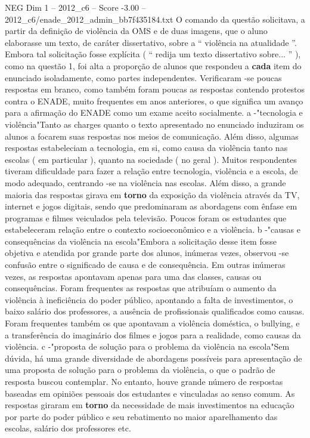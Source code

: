 \begin{textsample}{NEG Dim 1 – 2012\_c6 – Score -3.00 – 2012\_c6/enade\_2012\_admin\_bb7f435184.txt}
O comando da questão solicitava, a partir da definição de violência da OMS e de duas imagens, que o aluno elaborasse um texto, de caráter dissertativo, sobre a “ violência na atualidade ”.
Embora tal solicitação fosse explícita ( “ redija um texto dissertativo sobre... ” ), como na questão 1, foi alta a proporção de alunos que respondeu a \textbf{cada} item do enunciado isoladamente, como partes independentes.
Verificaram -se poucas respostas em branco, como também foram poucas as respostas contendo protestos contra o ENADE, muito frequentes em anos anteriores, o que significa um avanço para a afirmação do ENADE como um exame aceito socialmente. a -"tecnologia e violência"Tanto as charges quanto o texto apresentado no enunciado induziram os alunos a focarem suas respostas nos meios de comunicação.
Além disso, algumas respostas estabeleciam a tecnologia, em si, como causa da violência tanto nas escolas ( em particular ), quanto na sociedade ( no geral ).
Muitos respondentes tiveram dificuldade para fazer a relação entre tecnologia, violência e a escola, de modo adequado, centrando -se na violência nas escolas.
Além disso, a grande maioria das respostas girava em \textbf{torno} da exposição da violência através da TV, internet e jogos digitais, sendo que predominaram as abordagens com ênfase em programas e filmes veiculados pela televisão.
Poucos foram os estudantes que estabeleceram relação entre o contexto socioeconômico e a violência. b -"causas e consequências da violência na escola"Embora a solicitação desse item fosse objetiva e atendida por grande parte dos alunos, inúmeras vezes, observou -se confusão entre o significado de causa e de consequência.
Em outras inúmeras vezes, as respostas apontavam apenas para uma das classes, causas ou consequências.
Foram frequentes as respostas que atribuíam o aumento da violência à ineficiência do poder público, apontando a falta de investimentos, o baixo salário dos professores, a ausência de profissionais qualificados como causas.
Foram frequentes também os que apontavam a violência doméstica, o bullying, e a transferência do imaginário dos filmes e jogos para a realidade, como causas da violência. c -"proposta de solução para o problema da violência na escola"Sem dúvida, há uma grande diversidade de abordagens possíveis para apresentação de uma proposta de solução para o problema da violência, o que o padrão de resposta buscou contemplar.
No entanto, houve grande número de respostas baseadas em opiniões pessoais dos estudantes e vinculadas ao senso comum.
As respostas giraram em \textbf{torno} da necessidade de mais investimentos na educação por parte do poder público e seu rebatimento no maior aparelhamento das escolas, salário dos professores etc.

\end{textsample}
